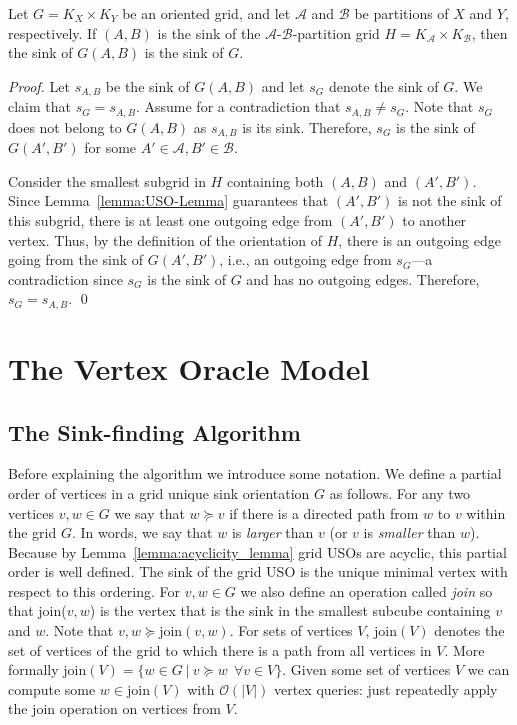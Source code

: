 \documentclass[runningheads,a4paper]{llncs}
\newcommand{\A}{\ensuremath{\mathcal A}}
\newcommand{\B}{\ensuremath{\mathcal B}}
\newcommand{\s}[1]{\ensuremath{s_{\scriptscriptstyle#1}}}
\newcommand{\join}{\mbox{join}\xspace}
\begin{document}
\begin{theorem}
\label{thm:the_sink_of_the_sink_of_the_induced_orientation_is_the_global_sink}

Let $G = K_X \times K_Y$ be an oriented grid,
and let $\A$ and $\B$ be partitions of $X$ and $Y$, respectively.
If $(A,B)$ is the sink of the $\A$-$\B$-partition grid $H = K_\A \times K_\B$, then the sink of $G(A,B)$ is the sink of $G$.
\end{theorem}
\begin{proof}
Let $\s{A,B}$ be the sink of $G(A,B)$ and let $\s{G}$ denote the sink of $G$.
We claim that $\s{G} = \s{A,B}$.
Assume for a contradiction that $\s{A,B}\neq \s{G}$.
Note that $\s{G}$ does not belong to $G(A,B)$ as $\s{A,B}$ is its sink.
Therefore, $\s{G}$ is the sink of $G(A', B')$ for some $A'\in \A, B'\in \B$.

Consider the smallest subgrid in $H$ containing both $(A,B)$ and $(A', B')$. 
Since Lemma~\ref{lemma:USO-Lemma} guarantees that $(A',B')$ is not the sink of this subgrid, there is at least one outgoing edge from $(A',B')$ to another vertex.
Thus, by the definition of the orientation of $H$, there is an outgoing edge going from the sink of $G(A',B')$, i.e., an outgoing edge from $\s{G}$---a contradiction since $\s{G}$ is the sink of $G$ and has no outgoing edges. 
Therefore, $\s{G} = \s{A,B}$. \qed
\end{proof}


\section{The Vertex Oracle Model}
\label{section:The vertex oracle model}

\subsection{The Sink-finding Algorithm}
\label{section:the_sink_finding_algorithm}

Before explaining the algorithm we introduce some notation. We define a partial order of vertices in a grid unique sink orientation $G$ as follows. 
For any two vertices $v,w \in G$ we say that $w \succeq v$ if there is a directed path from $w$ to $v$ within the grid $G$. In words, we say that $w$ is \emph{larger} than $v$ (or $v$ is \emph{smaller} than $w$).
Because by Lemma~\ref{lemma:acyclicity_lemma} grid USOs are acyclic, this partial order is well defined.
The sink of the grid USO is the unique minimal vertex with respect to this ordering. For $v,w \in G$ we also define an operation called \emph{\join} so that \join($v,w$) is the vertex that is the sink in the smallest subcube containing $v$ and $w$. Note that $v,w \succeq \join(v,w)$. For sets of vertices $V$, $\join(V)$ denotes the set of vertices of the grid to which there is a path from all vertices in $V$. More formally $\join(V) = \{w \in G \: | \: v \succeq w \:\: \forall v \in V \}$. Given some set of vertices $V$ we can compute some $w \in \join(V)$ with $\mathcal{O}(|V|)$ vertex queries: just repeatedly apply the $\join$ operation on vertices from $V$.
\end{document}
